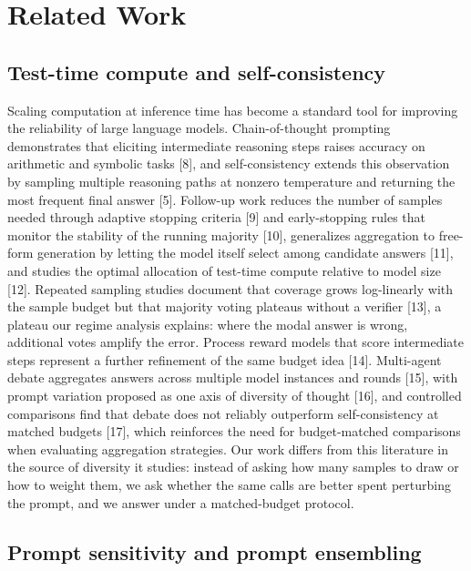 \documentclass[preprint,12pt]{elsarticle}
\begin{document}
\section{Related Work}


\subsection{Test-time compute and self-consistency}

Scaling computation at inference time has become a standard tool for improving the reliability of large language models. Chain-of-thought prompting demonstrates that eliciting intermediate reasoning steps raises accuracy on arithmetic and symbolic tasks [8], and self-consistency extends this observation by sampling multiple reasoning paths at nonzero temperature and returning the most frequent final answer [5]. Follow-up work reduces the number of samples needed through adaptive stopping criteria [9] and early-stopping rules that monitor the stability of the running majority [10], generalizes aggregation to free-form generation by letting the model itself select among candidate answers [11], and studies the optimal allocation of test-time compute relative to model size [12]. Repeated sampling studies document that coverage grows log-linearly with the sample budget but that majority voting plateaus without a verifier [13], a plateau our regime analysis explains: where the modal answer is wrong, additional votes amplify the error. Process reward models that score intermediate steps represent a further refinement of the same budget idea [14]. Multi-agent debate aggregates answers across multiple model instances and rounds [15], with prompt variation proposed as one axis of diversity of thought [16], and controlled comparisons find that debate does not reliably outperform self-consistency at matched budgets [17], which reinforces the need for budget-matched comparisons when evaluating aggregation strategies. Our work differs from this literature in the source of diversity it studies: instead of asking how many samples to draw or how to weight them, we ask whether the same calls are better spent perturbing the prompt, and we answer under a matched-budget protocol.

\subsection{Prompt sensitivity and prompt ensembling}
\end{document}
